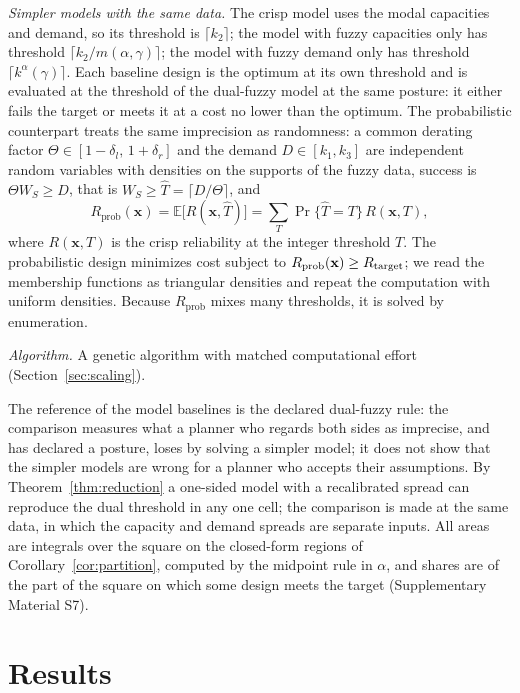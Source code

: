 \documentclass[Review,sagev,times]{sagej}%
\newcommand{\kag}{k^{\alpha}(\gamma)}\newcommand{\WS}{\tilde{W}_S}\newcommand{\Zsuf}{Z^{\mathrm{suf}}}
\begin{document}
\emph{Simpler models with the same data.} The crisp model uses the modal capacities and demand, so its
threshold is $\lceil k_2\rceil$; the model with fuzzy capacities only has threshold $\lceil k_2/m(\alpha,\gamma)\rceil$;
the model with fuzzy demand only has threshold $\lceil \kag\rceil$. Each baseline design is the optimum at its
own threshold and is evaluated at the threshold of the dual-fuzzy model at the same posture: it either fails
the target or meets it at a cost no lower than the optimum. The probabilistic counterpart treats the same
imprecision as randomness: a common derating factor $\Theta\in[1-\delta_l,\,1+\delta_r]$ and the demand
$D\in[k_1,k_3]$ are independent random variables with densities on the supports of the fuzzy data, success is
$\Theta W_S\ge D$, that is $W_S\ge\hat{T}=\lceil D/\Theta\rceil$, and
\begin{equation}
R_{\mathrm{prob}}(\mathbf{x}) = \mathbb{E}\big[R(\mathbf{x},\hat{T})\big] = \sum_{T} \Pr\{\hat{T} = T\}\, R(\mathbf{x},T),
\label{eq:rprob}
\end{equation}
where $R(\mathbf{x},T)$ is the crisp reliability at the integer threshold $T$. The probabilistic design
minimizes cost subject to $R_{\mathrm{prob}}(\mathbf{x}) \ge R_{\mathrm{target}}$; we read the membership functions as
triangular densities and repeat the computation with uniform densities. Because $R_{\mathrm{prob}}$ mixes many
thresholds, it is solved by enumeration.

\emph{Algorithm.} A genetic algorithm with matched computational effort (Section~\ref{sec:scaling}).

The reference of the model baselines is the declared dual-fuzzy rule: the comparison measures what a planner
who regards both sides as imprecise, and has declared a posture, loses by solving a simpler model; it does not
show that the simpler models are wrong for a planner who accepts their assumptions. By
Theorem~\ref{thm:reduction} a one-sided model with a recalibrated spread can reproduce the dual threshold in any
one cell; the comparison is made at the same data, in which the capacity and demand spreads are separate inputs.
All areas are integrals over the square on the closed-form regions of Corollary~\ref{cor:partition}, computed by
the midpoint rule in $\alpha$, and shares are of the part of the square on which some design meets the target
(Supplementary Material S7).

\section{Results} \label{sec:results}
\end{document}
